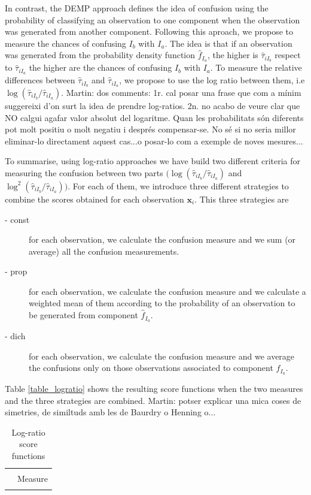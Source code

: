 \documentclass[10pt, a4paper]{article}
\newcommand{\m}[1]{\boldsymbol{#1}}
\begin{document}
\begin{spacing}{1.9}
In contrast, the DEMP approach defines the idea of confusion using the probability of classifying an observation to one component when the observation was generated from another component. Following this aproach, we propose to measure the chances of confusing $I_b$ with $I_a$. The idea is that if an observation was generated from the probability density function $\hat{f}_{I_a}$, the higher is $\hat{\tau}_{i I_b}$ respect to $\hat{\tau}_{i I_a}$ the higher are the chances of confusing $I_b$ with $I_a$. To measure the relative differences between  $\hat{\tau}_{i I_b}$ and $\hat{\tau}_{i I_a}$, we propose to use the log ratio between them, i.e $\log( \hat{\tau}_{i I_b}/\hat{\tau}_{i I_a})$.
{\color{blue} Martin: dos comments: 1r. cal posar una frase que com a mínim suggereixi d'on surt la idea de prendre log-ratios. 2n. no acabo de veure clar que NO calgui agafar valor absolut del logaritme. Quan  les probabilitats són diferents pot molt positiu o molt negatiu i després compensar-se. No sé si no seria millor eliminar-lo directament aquest cas...o posar-lo com a exemple de noves mesures...}

To summarise, using log-ratio approaches we have build two different criteria for measuring the confusion between two parts $(\log ( \hat{\tau}_{iI_b} / \hat{\tau}_{iI_a}) $ and $\log^2 (\hat{\tau}_{iI_b} / \hat{\tau}_{iI_a} ))$. For each of them, we introduce three different strategies to combine the scores obtained for each observation $\m x_i$. This three strategies are
\begin{description}
\item[- const] for each observation, we calculate the confusion measure and we sum (or average) all the confusion measurements.
\item[- prop] for each observation, we calculate the confusion measure and we calculate a weighted mean of them according to the probability of an observation to be generated from component $\hat{f}_{I_a}$.
\item[- dich] for each observation, we calculate the confusion measure and we average the confusions only on those observations associated to component $\hat{f}_{I_a}$.
\end{description}

Table \ref{table_logratio} shows the resulting score functions when the two measures and the three strategies are combined. {\color{blue} Martin: potser explicar una mica coses de simetries, de similtuds amb les de Baurdry o Henning o...}

\begin{table}[htpb]
\caption{Log-ratio score functions}
\begin{tabular}{c  c  c c }
 & \multicolumn{1}{c}{} & \multicolumn{1}{c}{}  & \multicolumn{1}{c}{} \\
  & \multicolumn{3}{c}{Measure} \\
\hline
 & \multicolumn{1}{c}{} & \multicolumn{1}{c}{} &  \multicolumn{1}{c}{} \\


\end{tabular}
\end{table}
\end{spacing}
\end{document}
